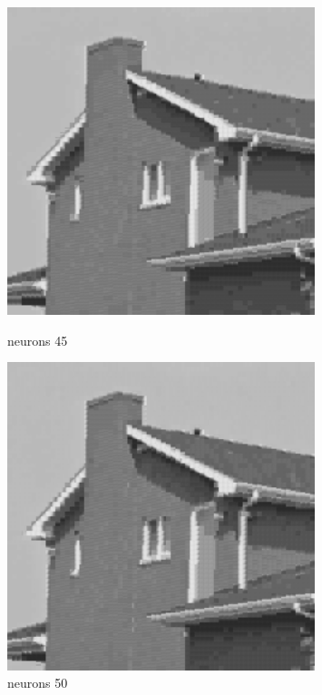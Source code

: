 \documentclass[../IDP_Task5_Karwowski_Kowalewski.tex]{subfiles}
\begin{document}
{{        \begin{figure}[!htbp]
            \begin{minipage}[c]{0.45\linewidth}
                \centering
                \includegraphics[width=0.8\textwidth]{img/kowalewski/crop_size_4_neurons_45.png}
                \caption{neurons 45}
            \end{minipage}\hfill
            \begin{minipage}[c]{0.45\linewidth}
                \centering
                \includegraphics[width=0.8\textwidth]{img/kowalewski/crop_size_4_neurons_50.png}
                \caption{neurons 50}
            \end{minipage}
        \end{figure}

}}
\end{document}
